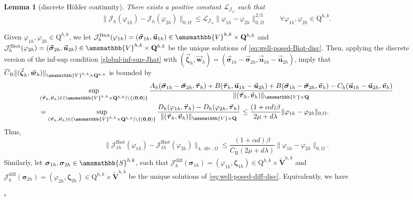 \documentclass[fleqn,a4paper]{cas-sc}
\renewcommand{\div}{\operatorname*{div}}
\newcommand{\bbS}{\amsmathbb{S}}
\newcommand{\Om}{\Omega}
\newcommand{\bu}{\boldsymbol{u}}
\newcommand{\bv}{\boldsymbol{v}}
\newcommand{\bw}{\boldsymbol{w}}
\newcommand{\bzeta}{\boldsymbol{\zeta}}
\newcommand{\0}{\boldsymbol{0}}
\newcommand\cJ{\mathcal{J}}
\newcommand\bQ{\mathbf{Q}}
\newcommand\bV{\mathbf{V}}
\newcommand\rQ{\mathrm{Q}}
\newcommand\bbV{\amsmathbb{V}}
\newcommand\bsigma{\boldsymbol{\sigma}}
\newcommand\btau{\boldsymbol{\tau}}
\numberwithin{equation}{section}
\numberwithin{figure}{section}
\newtheorem{lemma}[theorem]{Lemma}
\newenvironment{proof}{\noindent{\it Proof.}}{\hfill$\square$}
\begin{document}
%
{\begin{lemma}[discrete H\"older continuity]\label{lemma:continuity-Jh} 
    There exists a positive constant {$\mathcal{L}_{\cJ_h}$} such that 
    \begin{equation*}%
        \|\mathcal{J}_{{h}}({\varphi_{1h}})-\mathcal{J}_h({\varphi_{2h}})\|_{0,\Omega}
        \leq \mathcal{L}_{\mathcal{J}_h}\|\varphi_{1h}-\varphi_{2h}\|_{0, \Omega}^{2/3} \qquad \forall \varphi_{1h},\varphi_{2h} \in {\rQ^{h,k}}.
    \end{equation*} 
\end{lemma}
\begin{proof}
    Given $\varphi_{1h}, \varphi_{2h} \in {\rQ^{h,k}}$, we let $\cJ_h^{\mathrm{Biot}}(\varphi_{1h})=(\vec{\bsigma}_{1h}, \vec{\bu}_{1h}) \in \bbV^{h,k}\times \bQ^{h,k}$ and $\cJ_h^{\mathrm{Biot}}(\varphi_{2h})=(\vec{\bsigma}_{2h}, \vec{\bu}_{2h}) \in \bbV^{h,k}\times \bQ^{h,k}$ be the unique solutions of \eqref{eq:well-posed-Biot-disc}. Then, applying the discrete version of the inf-sup condition \eqref{global-inf-sup-Jhat} with $(\vec{\bzeta}_h, \vec{\bw}_h)=(\vec{\bsigma}_{1h}-\vec{\bsigma}_{2h},  \vec{\bu}_{1h}- \vec{\bu}_{2h})$, imply that $\overline{C}_{\mathrm{B}}\|(\vec{\bzeta}_h, \vec{\bw}_h)\|_{\bbV^{h,k}\times \bQ^{h,k}}$ is bounded by
    \begin{align*}
        \displaystyle & \sup_{(\vec{\btau}_h,\vec{\bv}_h) \in (\bbV^{h,k}\times \bQ^{h,k})\setminus \{(\mathbf{0},\mathbf{0})\}}\frac{A_h(\vec{\bsigma}_{1h}-\vec{\bsigma}_{2h},\vec{\btau}_h)+B(\vec{\btau}_h,\vec{\bu}_{1h}- \vec{\bu}_{2h})+ B(\vec{\bsigma}_{1h}-\vec{\bsigma}_{2h},\vec{\bv}_h)-C_h(\vec{\bu}_{1h}- \vec{\bu}_{2h},\vec{\bv}_h)}{\|(\vec{\btau}_h,\vec{\bv}_h)\|_{\bbV\times \bQ}}\\
        & = \sup_{(\vec{\btau}_h,\vec{\bv}_h) \in (\bbV^{h,k}\times \bQ^{h,k})\setminus \{(\mathbf{0},\mathbf{0})\}}\frac{D_h({\varphi}_{1h},\vec{\btau}_h)-D_h({\varphi}_{2h},\vec{\btau}_h)}{\|(\vec{\btau}_h,\vec{\bv}_h)\|_{\bbV\times \bQ}} \leq \frac{(1+\alpha d)\beta}{2\mu + d\lambda}\|\varphi_{1h}-\varphi_{2h}\|_{0,\Omega}.
    \end{align*}
Thus,
\begin{equation*}%
\|\cJ_{1h}^{\mathrm{Biot}}(\varphi_{1h})-\cJ_{1h}^{\mathrm{Biot}}(\varphi_{2h})\|_{4,\div;\Om}
\leq  \frac{(1+\alpha d)\beta}{\overline{C}_{\mathrm{B}}(2\mu + d\lambda)}\|\varphi_{1h}-\varphi_{2h}\|_{0,\Omega}.
\end{equation*}
Similarly, let  $\bsigma_{1h}, \bsigma_{2h} \in  \bbS^{h,k}$, such that $\cJ_{h}^{\mathrm{diff}}(\bsigma_{1h})=( \varphi_{1h}, \bzeta_{1h}) \in  \rQ^{h,k} \times \widetilde{\bV}^{h,\overline{k}}$ and $\cJ_{h}^{\mathrm{diff}}(\bsigma_{2h})=( \varphi_{2h}, \bzeta_{2h}) \in  \rQ^{h,k} \times \widetilde{\bV}^{h,\overline{k}}$ be the unique solutions of \eqref{eq:well-posed-diff-disc}.  Equivalently, we have

\end{proof}}
\end{document}
